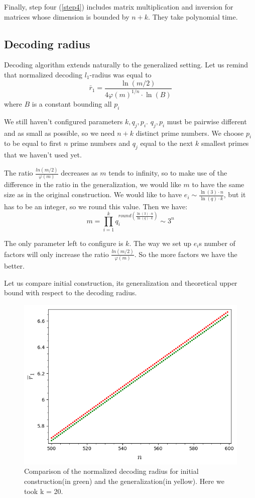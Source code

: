 \documentclass[12pt]{article}
\begin{document}
Finally, step four (\ref{step4}) includes matrix multiplication and inversion for matrices whose dimension is bounded by $n + k$. They take polynomial time.


\subsection{Decoding radius}
\label{subsec:radius_integers}


Decoding algorithm extends naturally to the generalized setting. Let us remind that normalized decoding $l_{1}$-radius was equal to
\[
    \bar r_{1} = \frac{\ln(m/2)}{4 \varphi(m)^{1/n} \cdot \ln(B)}
\]
where $B$ is a constant bounding all $p_{i}$

We still haven't configured parameters $k, q_{j}, p_{i}$. $q_{j}, p_{i}$ must be pairwise different and as small as possible, so we need $n+k$ distinct prime numbers. We choose $p_{i}$ to be equal to first $n$ prime numbers and $q_{j}$ equal to the next $k$ smallest primes that we haven't used yet.

The ratio $\frac{ln(m/2)}{\varphi(m)}$ decreases as $m$ tends to infinity, so to make use of the difference in the ratio in the generalization, we would like $m$ to have the same size as in the original construction. We would like to have $e_i \sim \frac{\ln(3) \cdot n}{\ln(q) \cdot k}$, but it has to be an integer, so we round this value. Then we have:
\[
    m = \prod_{i = 1}^{k} q_i^{round(\frac{\ln(3) \cdot n}{\ln(q) \cdot k})} \sim 3^n
\]

The only parameter left to configure is $k$. The way we set up $e_i$s number of factors will only increase the ratio $\frac{ln(m/2)}{\varphi(m)}$. So the more factors we have the better.

Let us compare initial construction, its generalization and theoretical upper bound with respect to the decoding radius.

\begin{figure}
  \includegraphics[width=\linewidth]{plot4.png}
  \caption{Comparison of the normalized decoding radius for initial construction(in green) and the generalization(in yellow). Here we took k = 20. }
  \label{fig:gen_int}
\end{figure}
\end{document}
